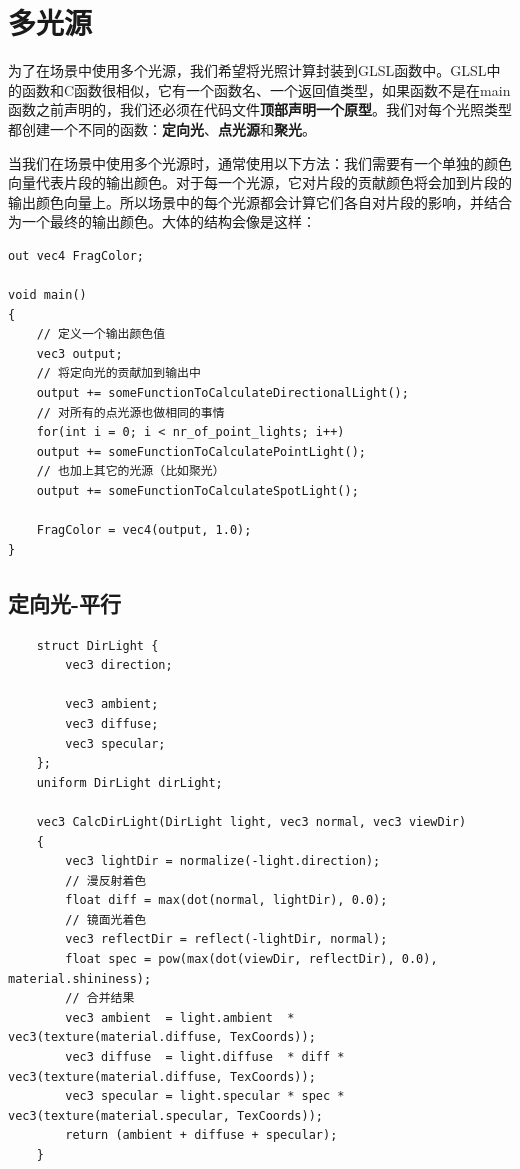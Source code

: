 \documentclass[UTF8,a4paper,12pt]{ctexbook}
\begin{document}
	
	\section{多光源}
		为了在场景中使用多个光源，我们希望将光照计算封装到GLSL函数中。GLSL中的函数和C函数很相似，它有一个函数名、一个返回值类型，如果函数不是在main函数之前声明的，我们还必须在代码文件\textbf{顶部声明一个原型}。我们对每个光照类型都创建一个不同的函数：\textbf{定向光}、\textbf{点光源}和\textbf{聚光}。
		
		当我们在场景中使用多个光源时，通常使用以下方法：我们需要有一个单独的颜色向量代表片段的输出颜色。对于每一个光源，它对片段的贡献颜色将会加到片段的输出颜色向量上。所以场景中的每个光源都会计算它们各自对片段的影响，并结合为一个最终的输出颜色。大体的结构会像是这样：
		
		\begin{lstlisting}
out vec4 FragColor;

void main()
{
	// 定义一个输出颜色值
	vec3 output;
	// 将定向光的贡献加到输出中
	output += someFunctionToCalculateDirectionalLight();
	// 对所有的点光源也做相同的事情
	for(int i = 0; i < nr_of_point_lights; i++)
	output += someFunctionToCalculatePointLight();
	// 也加上其它的光源（比如聚光）
	output += someFunctionToCalculateSpotLight();
	
	FragColor = vec4(output, 1.0);
}			
		\end{lstlisting}
		
		\subsection{定向光-平行}
			\begin{lstlisting}
	struct DirLight {
	    vec3 direction;
	
	    vec3 ambient;
	    vec3 diffuse;
	    vec3 specular;
	};  
	uniform DirLight dirLight;
	
	vec3 CalcDirLight(DirLight light, vec3 normal, vec3 viewDir)
	{
	    vec3 lightDir = normalize(-light.direction);
	    // 漫反射着色
	    float diff = max(dot(normal, lightDir), 0.0);
	    // 镜面光着色
	    vec3 reflectDir = reflect(-lightDir, normal);
	    float spec = pow(max(dot(viewDir, reflectDir), 0.0), material.shininess);
	    // 合并结果
	    vec3 ambient  = light.ambient  * vec3(texture(material.diffuse, TexCoords));
	    vec3 diffuse  = light.diffuse  * diff * vec3(texture(material.diffuse, TexCoords));
	    vec3 specular = light.specular * spec * vec3(texture(material.specular, TexCoords));
	    return (ambient + diffuse + specular);
	}			
			\end{lstlisting}
		
\end{document}

